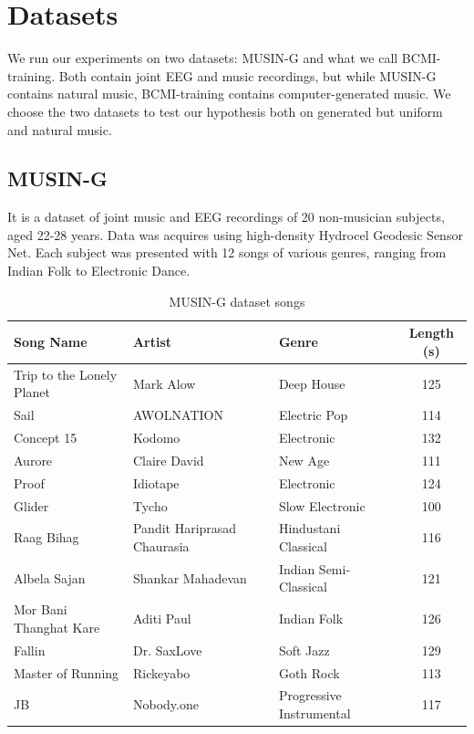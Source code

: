 \chapter{Datasets}
\label{chap:datasets}

We run our experiments on two datasets: MUSIN-G\cite{musing} and what we call BCMI-training\cite{bcmi}.
Both contain joint EEG and music recordings, but while MUSIN-G contains natural music, BCMI-training contains computer-generated music.
We choose the two datasets to test our hypothesis both on generated but uniform and natural music.

\section{MUSIN-G}

It is a dataset of joint music and EEG recordings of 20 non-musician subjects, aged 22-28 years\cite{musing}.
Data was acquires using high-density Hydrocel Geodesic Sensor Net.
Each subject was presented with 12 songs of various genres, ranging from Indian Folk to Electronic Dance.

\begin{table}[h]
\centering
\begin{tabular}{|l|l|l|c|}
\hline
Song Name & Artist & Genre & Length (s) \\
\hline
Trip to the Lonely Planet & Mark Alow & Deep House & 125 \\
Sail & AWOLNATION & Electric Pop & 114 \\
Concept 15 & Kodomo & Electronic & 132 \\
Aurore & Claire David & New Age & 111 \\
Proof & Idiotape & Electronic & 124 \\
Glider & Tycho & Slow Electronic & 100 \\
Raag Bihag & Pandit Hariprasad Chaurasia & Hindustani Classical & 116 \\
Albela Sajan & Shankar Mahadevan & Indian Semi-Classical & 121 \\
Mor Bani Thanghat Kare & Aditi Paul & Indian Folk & 126 \\
Fallin & Dr. SaxLove & Soft Jazz & 129 \\
Master of Running & Rickeyabo & Goth Rock & 113 \\
JB & Nobody.one & Progressive Instrumental & 117 \\
\hline
\end{tabular}
\caption{MUSIN-G dataset songs}
\label{tab:musing-songs}
\end{table}



